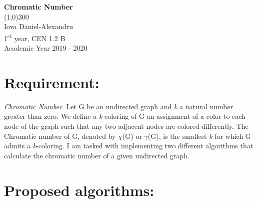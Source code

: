 \documentclass[12pt]{article}
\begin{document}
\begin{titlepage}
\begin{center}
\huge{\bfseries Chromatic Number}\\
[2 mm]
\line(1,0){300}\\
[2 cm]

\large Iova Daniel-Alexandru\\
[0.3 cm]
\large 1\textsuperscript{st} year, CEN 1.2 B\\
[0.3 cm]
\large Academic Year 2019 - 2020\\
[0.3 cm]
\date{\today}
\end{center}
\end{titlepage}

\section{Requirement:}
\textit{Chromatic Number}. Let G be an undirected graph and \textit{k} a natural number greater than zero. We define a \textit{k}-coloring of G an assignment of a color to each node of the graph such that any two adjacent nodes are colored differently. The Chromatic number of G, denoted by $\chi$(G) or $\gamma$(G), is the smallest \textit{k} for which G admits a \textit{k}-coloring. I am tasked with implementing two different algorithms that calculate the chromatic number of a given undirected graph.
\pagebreak
\section{Proposed algorithms:}
\end{document}
